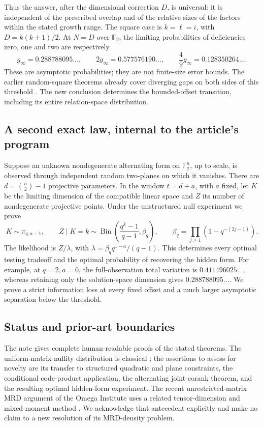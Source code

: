 \documentclass[11pt]{article}
\newcommand{\F}{\mathbb F}
\theoremstyle{definition}
\theoremstyle{remark}
\begin{document}
Thus the answer, after the dimensional correction $D$, is universal:
it is independent of the prescribed overlap and of the relative sizes
of the factors within the stated growth range. The square case is
$k=\ell=i$, with $D=k(k+1)/2$. At $N=D$ over $\F_2$, the limiting
probabilities of deficiencies zero, one and two are respectively
\[
 g_\infty=0.288788095\ldots,\qquad
 2g_\infty=0.577576190\ldots,\qquad
 \frac49g_\infty=0.128350264\ldots.
\]
These are asymptotic probabilities; they are not finite-size error
bounds. The earlier random-square theorems already cover diverging
gaps on both sides of this threshold \cite{CCMZ2015}. The new conclusion
determines the bounded-offset transition, including its entire
relation-space distribution.

\subsection{A second exact law, internal to the article's program}
Suppose an unknown nondegenerate alternating form on $\F_q^n$, up to
scale, is observed through independent random two-planes on which it
vanishes. There are $d=\binom n2-1$ projective parameters. In the window
$t=d+a$, with $a$ fixed, let $K$ be the limiting dimension of the
compatible linear space and $Z$ its number of nondegenerate projective
points. Under the unstructured null experiment we prove
\[
 K\sim\pi_{q,a-1},\qquad
 Z\mid K=k\sim\operatorname{Bin}
       \left(\frac{q^k-1}{q-1},\beta_q\right),
 \qquad \beta_q=\prod_{j\ge1}(1-q^{-(2j-1)}).
\]
The likelihood is $Z/\lambda$, with
$\lambda=\beta_q q^{1-a}/(q-1)$. This determines every optimal testing
tradeoff and the optimal probability of recovering the hidden form.
For example, at $q=2,a=0$, the full-observation total variation is
$0.411496025\ldots$, whereas retaining only the solution-space dimension
gives $0.288788095\ldots$. We prove a strict information loss at every
fixed offset and a much larger asymptotic separation below the threshold.

\subsection{Status and prior-art boundaries}
The note gives complete human-readable proofs of the stated theorems.
The uniform-matrix nullity distribution is classical
\cite{Gerth1986,FulmanGoldstein2015}; the assertions to assess for novelty
are its transfer to structured quadratic and plane constraints, the
conditional code-product application, the alternating joint-corank
theorem, and the resulting optimal hidden-form experiment.
The recent unrestricted-matrix MRD argument of the Omega Institute uses
a related tensor-dimension and mixed-moment method \cite{OmegaMRD2026}.
We acknowledge that antecedent explicitly and make no claim to a new
resolution of its MRD-density problem.
\end{document}

